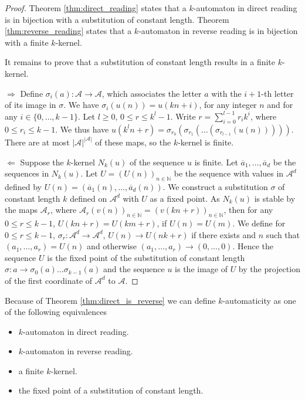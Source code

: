 \documentclass{article}
\begin{document}
\begin{proof}
Theorem \ref{thm:direct_reading} states that a $k$-automaton in direct reading 
is in bijection with a substitution of constant length. Theorem 
\ref{thm:reverse_reading} states that a $k$-automaton in reverse reading is in 
bijection with a finite $k$-kernel.

It remains to prove that a substitution of constant length results in a finite 
$k$-kernel.

$\Rightarrow$ Define $\sigma_i(a) : \mathcal{A \to A}$, which associates the
letter $a$ with the $i + 1$-th letter of its image in $\sigma$. We have 
$\sigma_i(u(n)) = u(kn + i)$, for any integer $n$ and for any 
$i \in \{0, \ldots, k - 1\}$. Let $l \ge 0$, $0 \le r \le k^l - 1$. Write
$r =  \sum_{i = 0}^{l - 1} r_i k^i$, where $0 \le r_i \le k - 1$. We thus have
$u(k^l n + r) = \sigma_{r_0}(\sigma_{r_1}( \ldots (\sigma_{r_{l - 1}}(u(n)))))$.
There are at most $|\mathcal{A}|^{|\mathcal{A}|}$ of these maps, so the
$k$-kernel is finite.

$\Leftarrow$ Suppose the $k$-kernel $N_k(u)$ of the sequence $u$ is finite.
Let $\overline{a}_1, \ldots, \overline{a}_d$ be the sequences in $N_k(u)$. Let
$U = (U(n))_{n \in \mathbb{N}}$ be the sequence with values in $\mathcal{A}^d$
defined by $U(n) = (\overline{a}_1(n), \ldots, \overline{a}_d(n))$. We 
construct a substitution $\sigma$ of constant length $k$ defined on 
$\mathcal{A}^d$ with $U$ as a fixed point. As $N_k(u)$ is stable by the maps
$\mathcal{A}_r$, where 
$\mathcal{A}_r(v(n))_{n \in \mathbb{N}} = (v(kn + r))_{n \in \mathbb{N}}$, then
for any $0 \le r \le k - 1$, $U(kn + r) = U(km + r)$, if $U(n) = U(m)$. We
define for $0 \le r \le k - 1$, $\sigma_r : \mathcal{A}^d \to \mathcal{A}^d$,
$U(n) \to U(nk +r)$ if there exists and $n$ such that 
$(a_1, \ldots, a_r) = U(n)$ and otherwise 
$(a_1, \ldots, a_r) \to (0, \ldots, 0)$. Hence the sequence $U$ is the fixed
point of the substitution of constant length 
$\sigma: a \to \sigma_0(a) \ldots \sigma_{k - 1}(a)$ and the sequence $u$ is
the image of $U$ by the projection of the first coordinate of $\mathcal{A}^d$ 
to $\mathcal{A}$.
\end{proof}

\begin{definition}
Because of Theorem \ref{thm:direct_is_reverse} we can define $k$-automaticity
as one of the following equivalences
\begin{itemize}
\item $k$-automaton in direct reading.
\item $k$-automaton in reverse reading.
\item a finite $k$-kernel. 
\item the fixed point of a substitution of constant length.
\end{itemize}
\end{definition}
\end{document}
